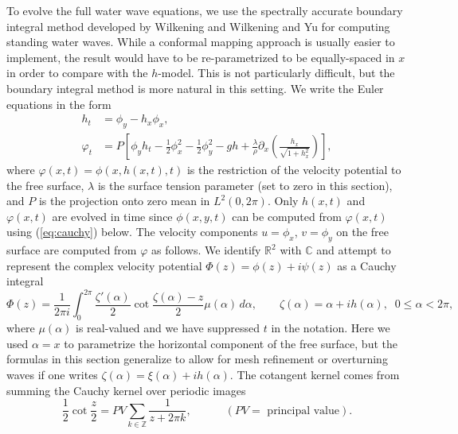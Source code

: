 \documentclass[11pt]{article}
\theoremstyle{plain}
\theoremstyle{definition}
\theoremstyle{definition}
\newcommand{\pa}{\partial}
\newcommand{\mbb}[1]{\mathbb{#1}}
\begin{document}
To evolve the full water wave equations, we use the spectrally
accurate boundary integral method developed by Wilkening
\cite{wilkening:standing-waves-2011} and Wilkening and Yu
\cite{wilkening-yu:shooting-2012} for computing standing water waves.
While a conformal mapping approach
\cite{dyachenko:96a,dyachenko:96b,milewski:10} is usually easier to
implement, the result would have to be re-parametrized to be
equally-spaced in $x$ in order to compare with the $h$-model. This is
not particularly difficult, but the boundary integral method is more
natural in this setting. We write the Euler equations in the form
%
\begin{equation}
  \label{eq:euler}
  \begin{aligned}
    h_t &= \phi_y - h_x\phi_x, \\
    \varphi_t &= P\left[ \phi_yh_t - \frac12\phi_x^2 - \frac12\phi_y^2 - gh +
      \frac\lambda\rho\pa_x\left(\frac{h_x}{\sqrt{1+h_x^2}}\right)\right],
  \end{aligned}
\end{equation}
%
where $\varphi(x,t) = \phi(x,h(x,t),t)$ is the restriction of the
velocity potential to the free surface, $\lambda$ is the surface
tension parameter (set to zero in this section), and $P$ is the
projection onto zero mean in $L^2(0,2\pi)$. Only $h(x,t)$ and
$\varphi(x,t)$ are evolved in time since $\phi(x,y,t)$ can be computed
from $\varphi(x,t)$ using (\ref{eq:cauchy}) below. The velocity
components $u=\phi_x$, $v=\phi_y$ on the free surface are computed
from $\varphi$ as follows. We identify $\mbb{R}^2$ with $\mbb{C}$ and
attempt to represent the complex velocity potential
$\Phi(z)=\phi(z)+i\psi(z)$ as a Cauchy integral
%
\begin{equation}\label{eq:cauchy}
  \Phi(z) = \frac1{2\pi i}\int_0^{2\pi} \frac{\zeta'(\alpha)}2\cot\frac{\zeta(\alpha)-z}2
  \mu(\alpha)\,d\alpha, \qquad
  \zeta(\alpha) = \alpha + ih(\alpha), \;\; 0\le\alpha<2\pi,
\end{equation}
%
where $\mu(\alpha)$ is real-valued and we have suppressed $t$ in the
notation. Here we used $\alpha=x$ to parametrize the horizontal
component of the free surface, but the formulas in this section
generalize to allow for mesh refinement or overturning waves if one
writes $\zeta(\alpha)=\xi(\alpha)+i h(\alpha)$.  The cotangent kernel
comes from summing the Cauchy kernel over periodic images
%
\begin{equation}
  \frac12\cot\frac z2 = PV\sum_{k\in\mbb Z} \frac1{z+2\pi k}, \qquad\quad
  (PV = \text{ principal value}).
\end{equation}
\end{document}
